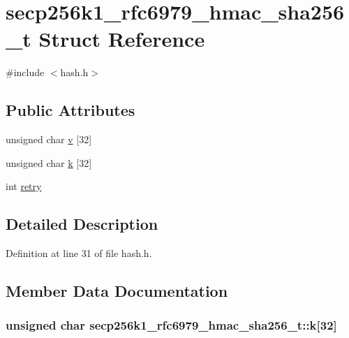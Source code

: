 \hypertarget{structsecp256k1__rfc6979__hmac__sha256__t}{}\section{secp256k1\+\_\+rfc6979\+\_\+hmac\+\_\+sha256\+\_\+t Struct Reference}
\label{structsecp256k1__rfc6979__hmac__sha256__t}


{\ttfamily \#include $<$hash.\+h$>$}

\subsection*{Public Attributes}
\begin{DoxyCompactItemize}
\item 
unsigned char \hyperlink{structsecp256k1__rfc6979__hmac__sha256__t_acce53d5308c7d406245a07e5dde49e78}{v} \mbox{[}32\mbox{]}
\item 
unsigned char \hyperlink{structsecp256k1__rfc6979__hmac__sha256__t_add18bee94ca2a67fb59f2188e505ad52}{k} \mbox{[}32\mbox{]}
\item 
int \hyperlink{structsecp256k1__rfc6979__hmac__sha256__t_a533be4a8cc6bf3112ca8c64cda3236a8}{retry}
\end{DoxyCompactItemize}


\subsection{Detailed Description}


Definition at line 31 of file hash.\+h.



\subsection{Member Data Documentation}
\hypertarget{structsecp256k1__rfc6979__hmac__sha256__t_add18bee94ca2a67fb59f2188e505ad52}{}
\subsubsection[{k}]{\setlength{\rightskip}{0pt plus 5cm}unsigned char secp256k1\+\_\+rfc6979\+\_\+hmac\+\_\+sha256\+\_\+t\+::k\mbox{[}32\mbox{]}}\label{structsecp256k1__rfc6979__hmac__sha256__t_add18bee94ca2a67fb59f2188e505ad52}


